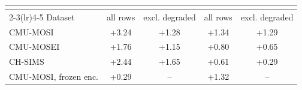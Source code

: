 
\begin{tabular}{lcccc}
\toprule
 & \multicolumn{2}{c}{\tokenlevel{}} & \multicolumn{2}{c}{\modlevel{}} \\
\cmidrule(lr){2-3}\cmidrule(lr){4-5}
Dataset & all rows & excl. degraded & all rows & excl. degraded \\
\midrule
CMU-MOSI & +3.24 & +1.28 & +1.34 & +1.29 \\
CMU-MOSEI & +1.76 & +1.15 & +0.80 & +0.65 \\
CH-SIMS & +2.44 & +1.65 & +0.61 & +0.29 \\
\addlinespace
CMU-MOSI, frozen enc. & +0.29 & -- & +1.32 & -- \\
\bottomrule
\end{tabular}

